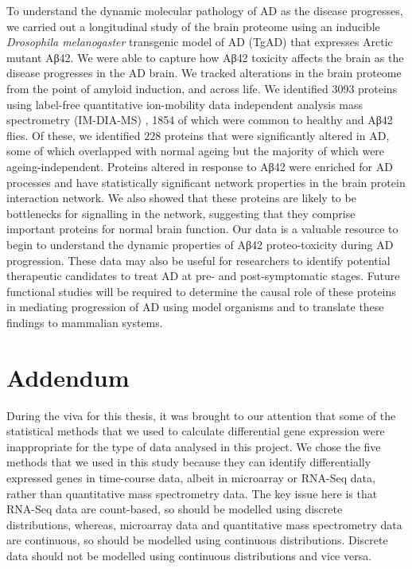 To understand the dynamic molecular pathology of AD as the disease progresses, we carried out a longitudinal study of the brain proteome using an inducible \textit{Drosophila melanogaster} transgenic model of AD (TgAD) that expresses Arctic mutant Aβ42.
We were able to capture how Aβ42 toxicity affects the brain as the disease progresses in the AD brain.
We tracked alterations in the brain proteome from the point of amyloid induction, and across life.
We identified \num{3093} proteins using label-free quantitative ion-mobility data independent analysis mass spectrometry (IM-DIA-MS) \cite{Rodriguez-Suarez2013}, \num{1854} of which were common to healthy and Aβ42 flies.
Of these, we identified $228$ proteins that were significantly altered in AD, some of which overlapped with normal ageing but the majority of which were ageing-independent.
Proteins altered in response to Aβ42 were enriched for AD processes and have statistically significant network properties in the brain protein interaction network.
We also showed that these proteins are likely to be bottlenecks for signalling in the network, suggesting that they comprise important proteins for normal brain function.
Our data is a valuable resource to begin to understand the dynamic properties of Aβ42 proteo-toxicity during AD progression.
These data may also be useful for researchers to identify potential therapeutic candidates to treat AD at pre- and post-symptomatic stages.
Future functional studies will be required to determine the causal role of these proteins in mediating progression of AD using model organisms and to translate these findings to mammalian systems.

\section*{Addendum}

During the viva for this thesis, it was brought to our attention that some of the statistical methods
that we used to calculate differential gene expression were inappropriate for the type of data analysed in this project.
We chose the five methods that we used in this study because they can identify differentially expressed genes
in time-course data, albeit in microarray or RNA-Seq data, rather than quantitative mass spectrometry data.
The key issue here is that RNA-Seq data are count-based, so should be modelled using discrete distributions,
whereas, microarray data and quantitative mass spectrometry data are continuous, so should be modelled using
continuous distributions. Discrete data should not be modelled using continuous distributions and vice versa.

